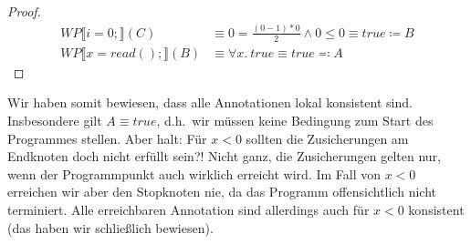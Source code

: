 \documentclass[hidelinks]{article}
\theoremstyle{plain}
\theoremstyle{definition}
\theoremstyle{rem}
\begin{document}
\begin{sloppypar}
\begin{proof}
\begin{align*}
WP\llbracket i=0;\rrbracket(C)&\equiv 0=\frac{(0-1)*0}{2}\wedge 0\le 0\equiv true\coloneqq B\\
WP\llbracket x=read();\rrbracket(B)&\equiv \forall x.\ true\equiv true\eqqcolon A
\end{align*}
\end{proof}
Wir haben somit bewiesen, dass alle Annotationen lokal konsistent sind. Insbesondere gilt $A\equiv true$, d.h.\ wir müssen keine Bedingung zum Start des Programmes stellen. Aber halt: Für $x<0$ sollten die Zusicherungen am Endknoten doch nicht erfüllt sein?! Nicht ganz, die Zusicherungen gelten nur, wenn der Programmpunkt auch wirklich erreicht wird. Im Fall von $x<0$ erreichen wir aber den Stopknoten nie, da das Programm offensichtlich nicht terminiert. Alle erreichbaren Annotation sind allerdings auch für $x<0$ konsistent (das haben wir schließlich bewiesen).

\end{sloppypar}
\end{document}
